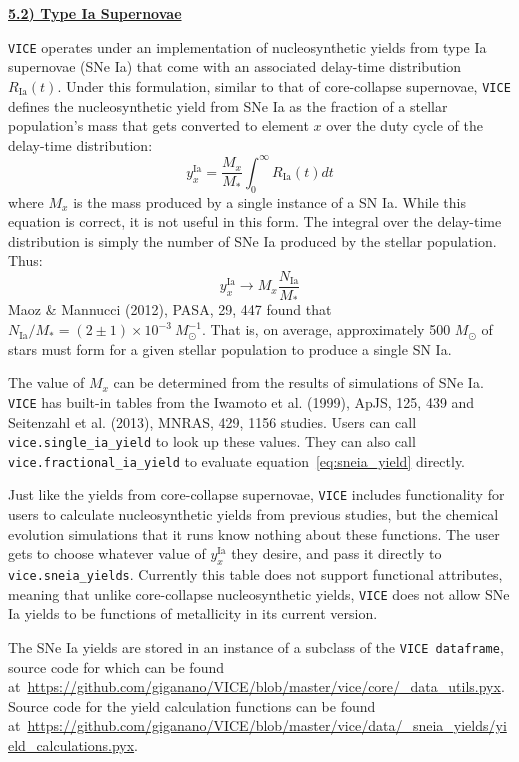 \documentclass{report}
\begin{document}
\newpage 
\noindent 
\begin{center}
\hypertarget{yields:sneia}{
	\underline{\LARGE
		\textbf{5.2) Type Ia Supernovae}
	}
}
\end{center}
\texttt{VICE} operates under an implementation of nucleosynthetic yields from 
type Ia supernovae (SNe Ia) that come with an associated delay-time 
distribution $R_\text{Ia}(t)$. Under this formulation, similar to that of 
core-collapse supernovae, \texttt{VICE} defines the nucleosynthetic yield from 
SNe Ia as the fraction of a stellar population's mass that gets converted to 
element $x$ over the duty cycle of the delay-time distribution: 
\begin{equation}
y_x^\text{Ia} = \frac{M_x}{M_*}\int_0^\infty R_\text{Ia}(t)dt
\end{equation}
where $M_x$ is the mass produced by a single instance of a SN Ia. While this 
equation is correct, it is not useful in this form. The integral over the 
delay-time distribution is simply the number of SNe Ia produced by the 
stellar population. Thus: 
\begin{equation}
\label{eq:sneia_yield}
y_x^\text{Ia} \rightarrow M_x \frac{N_\text{Ia}}{M_*} 
\end{equation}
Maoz \& Mannucci (2012), PASA, 29, 447 found that $N_\text{Ia}/M_* = 
(2 \pm 1)\times10^{-3}\ M_\odot^{-1}$. That is, on average, approximately 
500 $M_\odot$ of stars must form for a given stellar population to produce 
a single SN Ia. 
\par 
The value of $M_x$ can be determined from the results of simulations of SNe Ia. 
\texttt{VICE} has built-in tables from the Iwamoto et al. (1999), ApJS, 125, 
439 and Seitenzahl et al. (2013), MNRAS, 429, 1156 studies. Users can call 
\texttt{vice.single\_ia\_yield} to look up these values. They can 
also call \texttt{vice.fractional\_ia\_yield} to evaluate 
equation~\ref{eq:sneia_yield} directly. 
\par
Just like the yields from core-collapse supernovae, \texttt{VICE} includes 
functionality for users to calculate nucleosynthetic yields from previous 
studies, but the chemical evolution simulations that it runs know nothing 
about these functions. The user gets to choose whatever value of 
$y_x^\text{Ia}$ they desire, and pass it directly to 
\texttt{vice.sneia\_yields}. Currently this table does not support functional 
attributes, meaning that unlike core-collapse nucleosynthetic yields, 
\texttt{VICE} does not allow SNe Ia yields to be functions of metallicity in 
its current version. 
\par 
The SNe Ia yields are stored in an instance of a subclass of the 
\texttt{VICE dataframe}, source code for which can be found 
at~\url{https://github.com/giganano/VICE/blob/master/vice/core/_data_utils.pyx}. 
Source code for the yield calculation functions can be found 
at~\url{https://github.com/giganano/VICE/blob/master/vice/data/_sneia_yields/yield_calculations.pyx}. 
\end{document}
